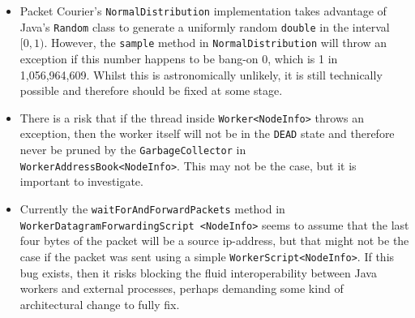 \begin{itemize}
    \item Packet Courier's \texttt{NormalDistribution} implementation takes advantage of Java's
    \texttt{Random}\cite{java_Random} class to generate a uniformly random \texttt{double} in the interval $[0, 1)$.
    However, the \texttt{sample} method in \texttt{NormalDistribution} will throw an exception if this number happens
    to be bang-on 0, which is 1 in 1,056,964,609\cite{floating_point_numbers_in_normal_interval}. Whilst this is
    astronomically unlikely, it is still technically possible and therefore should be fixed at some stage.
    \item There is a risk that if the thread inside \texttt{Worker<NodeInfo>} throws an exception, then the worker
    itself will not be in the \texttt{DEAD} state and therefore never be pruned by the \texttt{GarbageCollector} in
    \texttt{WorkerAddressBook<NodeInfo>}. This may not be the case, but it is important to investigate.
    \item Currently the \texttt{waitForAndForwardPackets} method in \texttt{WorkerDatagramForwardingScript <NodeInfo>}
    seems to assume that the last four bytes of the packet will be a source ip-address, but that might not be the
    case if the packet was sent using a simple \texttt{WorkerScript<NodeInfo>}. If this bug exists, then it risks
    blocking the fluid interoperability between Java workers and external processes, perhaps demanding some kind of
    architectural change to fully fix.
\end{itemize}
